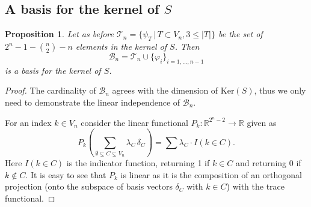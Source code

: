 \documentclass[12pt]{amsart}
\numberwithin{theorem}{section}
\newtheorem{proposition}[theorem]{Proposition}
\theoremstyle{remark}
\newcommand{\kerr}{\text{Ker}}
\begin{document}
\subsection{A basis for the kernel of $S$} \label{The subsection with the actual basis for the kernel of S}
\begin{proposition} \label{Proposition with the basis for the kernel}
Let as before $\mathcal T_n = \{\psi_T\,|\, T\subset V_n, 3\le|T|\}$ be the set of $2^n-1-{n\choose 2}-n$ elements in the kernel of $S$. Then 
$$\mathcal B_n = \mathcal T_n \cup \{\varphi_i\}_{i=1,\dots, n-1}$$
is a basis for the kernel of $S$.  
\end{proposition}
\begin{proof}
The cardinality of $\mathcal B_n$ agrees with the dimension of $\kerr(S)$, thus we only need to demonstrate the linear independence of $\mathcal B_n$. 

For an index $k\in V_n$ consider the linear functional $P_k:\mathbb R^{2^n-2}\to \mathbb R$ given as 
$$P_k\left( \sum_{\emptyset\subsetneq C \subsetneq V_n} \lambda _C\, \delta_C\right) = \sum \lambda _C \cdot I(k\in C). $$
Here $I(k\in C)$ is the indicator function, returning 1 if $k\in C$ and returning $0$ if $k\notin C$. It is easy to see that $P_k$ is linear as it is the composition of an orthogonal projection (onto the subspace of basis vectors $\delta_C$ with $k\in C$) with the trace functional. 


\end{proof}
\end{document}
